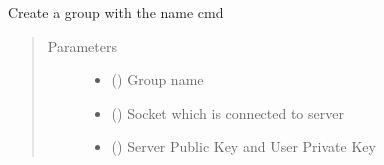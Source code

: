 \documentclass[letterpaper,10pt,english]{sphinxmanual}
\begin{document}
\begin{fulllineitems}
\label{\detokenize{userInputHandler:userInputHandler.createGroup}}
Create a group with the name cmd
\begin{quote}\begin{description}
\item[{Parameters}] \leavevmode\begin{itemize}
\item {} 
 () \textendash{} Group name

\item {} 
 () \textendash{} Socket which is connected to server

\item {} 
 () \textendash{} Server Public Key and User Private Key

\end{itemize}

\end{description}\end{quote}

\end{fulllineitems}

\end{document}
